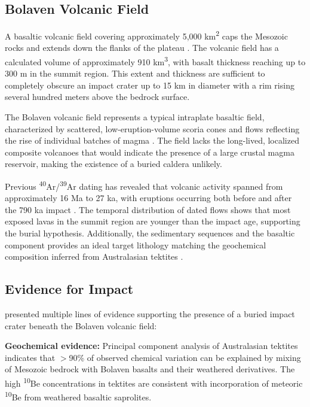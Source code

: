 \documentclass[twocolumn,11pt]{article}
\begin{document}
\subsection{Bolaven Volcanic Field}

A basaltic volcanic field covering approximately 5,000 km\textsuperscript{2} caps the Mesozoic rocks and extends down the flanks of the plateau \citep{Sieh2019}. The volcanic field has a calculated volume of approximately 910 km\textsuperscript{3}, with basalt thickness reaching up to 300 m in the summit region. This extent and thickness are sufficient to completely obscure an impact crater up to 15 km in diameter with a rim rising several hundred meters above the bedrock surface.

The Bolaven volcanic field represents a typical intraplate basaltic field, characterized by scattered, low-eruption-volume scoria cones and flows reflecting the rise of individual batches of magma \citep{Valentine2010}. The field lacks the long-lived, localized composite volcanoes that would indicate the presence of a large crustal magma reservoir, making the existence of a buried caldera unlikely.

Previous \textsuperscript{40}Ar/\textsuperscript{39}Ar dating has revealed that volcanic activity spanned from approximately 16 Ma to 27 ka, with eruptions occurring both before and after the 790 ka impact \citep{Sieh2019, Sanematsu2011}. The temporal distribution of dated flows shows that most exposed lavas in the summit region are younger than the impact age, supporting the burial hypothesis. Additionally, the sedimentary sequences and the basaltic component provides an ideal target lithology matching the geochemical composition inferred from Australasian tektites \citep{Blum1992, Koeberl1992, Sieh2019}.

\subsection{Evidence for Impact}

\citet{Sieh2019} presented multiple lines of evidence supporting the presence of a buried impact crater beneath the Bolaven volcanic field:

\textbf{Geochemical evidence:} Principal component analysis of Australasian tektites indicates that $>$90\% of observed chemical variation can be explained by mixing of Mesozoic bedrock with Bolaven basalts and their weathered derivatives. The high \textsuperscript{10}Be concentrations in tektites are consistent with incorporation of meteoric \textsuperscript{10}Be from weathered basaltic saprolites.
\end{document}
